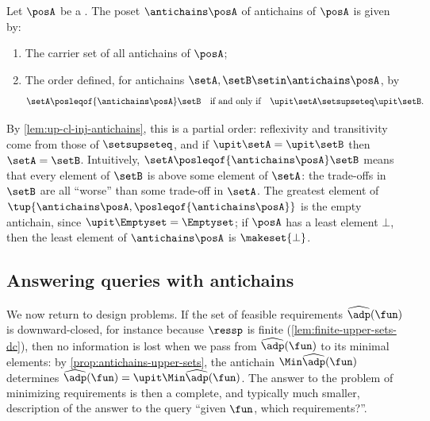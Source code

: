 \begin{definition}
    \label{def:antichain-order}
    Let $\posA$ be a .
    The poset $\antichains \posA$ of antichains of $\posA$ is given by:

    \constit
    \begin{enumerate}
        \item The carrier set of all antichains of $\posA$;
        \item The order defined, for antichains $\setA, \setB \setin \antichains \posA$, by
              \begin{equation}
                  \setA \posleqof{\antichains \posA} \setB
                  \quad \text{if and only if} \quad
                  \upit \setA \setsupseteq \upit \setB.
              \end{equation}
    \end{enumerate}
\end{definition}

By \cref{lem:up-cl-inj-antichains}, this is a partial order: reflexivity and transitivity come from those of $\setsupseteq$, and if $\upit \setA = \upit \setB$ then $\setA = \setB$.
Intuitively, $\setA \posleqof{\antichains \posA} \setB$ means that every element of $\setB$ is above some element of $\setA$: the trade-offs in $\setB$ are all ``worse'' than some trade-off in $\setA$.
The greatest element of $\tup{\antichains \posA, \posleqof{\antichains \posA}}$ is the empty antichain, since $\upit \Emptyset = \Emptyset$; if $\posA$ has a least element $\bot$, then the least element of $\antichains \posA$ is $\makeset{\bot}$.


\subsection{Answering queries with antichains}
\label{sec:dp-queries-antichains}

We now return to design problems.
If the set of feasible requirements $\widehat{\adp}(\fun)$ is downward-closed, for instance because $\ressp$ is finite (\cref{lem:finite-upper-sets-dc}), then no information is lost when we pass from $\widehat{\adp}(\fun)$ to its minimal elements: by \cref{prop:antichains-upper-sets}, the antichain $\Min \widehat{\adp}(\fun)$ determines $\widehat{\adp}(\fun) = \upit \Min \widehat{\adp}(\fun)$.
The answer to the problem of minimizing requirements is then a complete, and typically much smaller, description of the answer to the query ``given $\fun$, which requirements?''.

